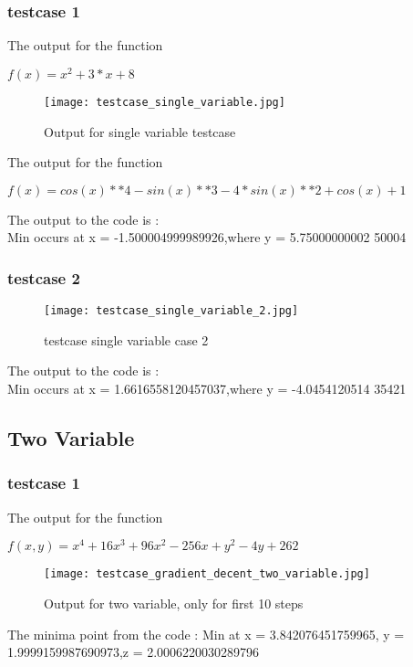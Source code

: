 \documentclass[titlepage, 11pt]{article}
\begin{document}
\subsubsection{testcase 1}
The output for the function \\
\begin{center}
$f(x) = x^2 + 3*x + 8$ 
\end{center}
\begin{figure}[ht]
    \centering
    \texttt{[image: testcase\_single\_variable.jpg]}
    \caption{Output for single variable testcase}
    \label{fig:testcase single variable jpg}
\end{figure}
The output for the function \\
\begin{center}
$f(x) = cos(x)**4 - sin(x)**3 - 4*sin(x)**2 + cos(x) + 1$
\end{center}
The output to the code is : \\
Min occurs at x = -1.500004999989926,where y = 5.75000000002
50004
\subsubsection{testcase 2}
\begin{figure}[ht]
    \centering
    \texttt{[image: testcase\_single\_variable\_2.jpg]}
    \caption{testcase single variable case 2}
    \label{fig:test casesingle variable 2}
\end{figure}

The output to the code is : \\
Min occurs at x = 1.6616558120457037,where y = -4.0454120514
35421

\subsection{Two Variable}
\subsubsection{testcase 1}
The output for the function \\
\begin{center}
    $f(x,y) = x^4 + 16x^3 + 96x^2 - 256x + y^2 - 4y + 262$
\end{center}
\begin{figure}[ht]
    \centering
    \texttt{[image: testcase\_gradient\_decent\_two\_variable.jpg]}
    \caption{Output for two variable, only for first 10 steps}
    \label{fig:Output for two variable}
\end{figure}
The minima point from the code : 
Min at x = 3.842076451759965, y = 1.9999159987690973,z =
 2.0006220030289796
\end{document}
